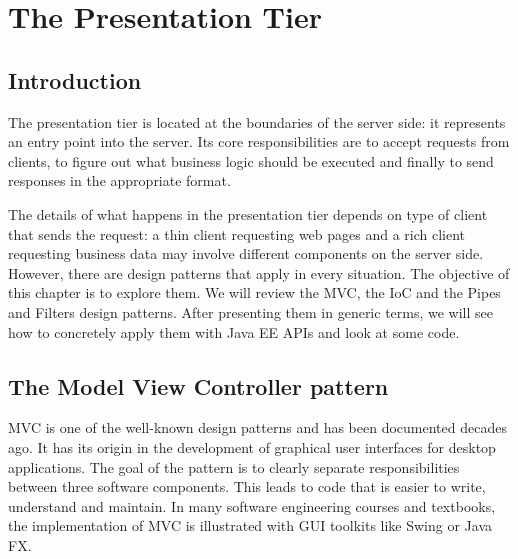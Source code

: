 \chapter{The Presentation Tier}
\label{ch:presentation-tier}

\section{Introduction}

The presentation tier is located at the boundaries of the server side: it represents an entry point into the server. Its core responsibilities are to accept requests from clients, to figure out what business logic should be executed and finally to send responses in the appropriate format. 

The details of what happens in the presentation tier depends on type of client that sends the request: a thin client requesting web pages and a rich client requesting business data may involve different components on the server side. However, there are design patterns that apply in every situation. The objective of this chapter is to explore them. We will review the \ac{MVC}, the \ac{IoC} and the Pipes and Filters design patterns. After presenting them in generic terms, we will see how to concretely apply them with Java EE APIs and look at some code.

\section{The Model View Controller pattern}


\ac{MVC} is one of the well-known design patterns and has been documented decades ago. It has its origin in the development of graphical user interfaces for desktop applications. The goal of the pattern is to clearly separate responsibilities between three software components. This leads to code that is easier to write, understand and maintain. In many software engineering courses and textbooks, the implementation of \ac{MVC} is illustrated with \ac{GUI} toolkits like Swing or Java FX. 

